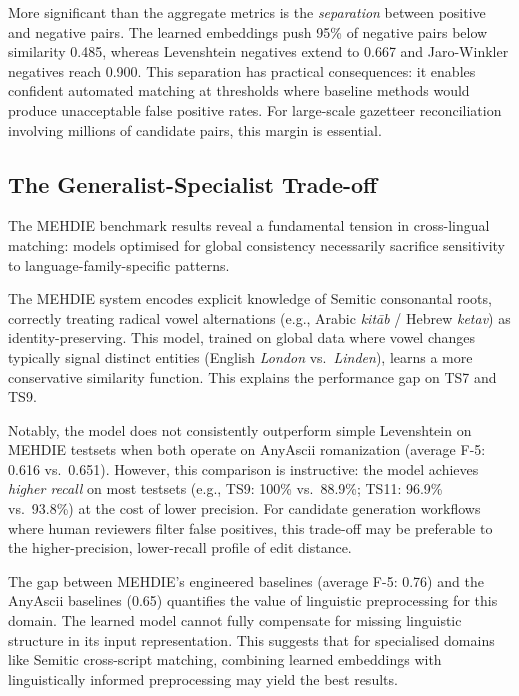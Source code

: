 \documentclass[11pt]{article}
\begin{document}
    More significant than the aggregate metrics is the \emph{separation} between
    positive and negative pairs. The learned embeddings push 95\% of negative pairs
    below similarity 0.485, whereas Levenshtein negatives extend to 0.667 and
    Jaro-Winkler negatives reach 0.900. This separation has practical consequences:
    it enables confident automated matching at thresholds where baseline methods
    would produce unacceptable false positive rates. For large-scale gazetteer
    reconciliation involving millions of candidate pairs, this margin is essential.

    \subsection{The Generalist-Specialist Trade-off}

    The MEHDIE benchmark results reveal a fundamental tension in cross-lingual
    matching: models optimised for global consistency necessarily sacrifice
    sensitivity to language-family-specific patterns.

    The MEHDIE system encodes explicit knowledge of Semitic consonantal roots,
    correctly treating radical vowel alternations (e.g., Arabic \emph{kitāb} /
    Hebrew \emph{ketav}) as identity-preserving. This model, trained on global
    data where vowel changes typically signal distinct entities (English
    \emph{London} vs.\ \emph{Linden}), learns a more conservative similarity
    function. This explains the performance gap on TS7 and TS9.

    Notably, the model does not consistently outperform simple Levenshtein on
    MEHDIE testsets when both operate on AnyAscii romanization (average F-5:
    0.616 vs.\ 0.651). However, this comparison is instructive: the model
    achieves \emph{higher recall} on most testsets (e.g., TS9: 100\% vs.\ 88.9\%;
    TS11: 96.9\% vs.\ 93.8\%) at the cost of lower precision. For candidate
    generation workflows where human reviewers filter false positives, this
    trade-off may be preferable to the higher-precision, lower-recall profile
    of edit distance.

    The gap between MEHDIE's engineered baselines (average F-5: 0.76) and the
    AnyAscii baselines (0.65) quantifies the value of linguistic preprocessing
    for this domain. The learned model cannot fully compensate for missing
    linguistic structure in its input representation. This suggests that for
    specialised domains like Semitic cross-script matching, combining learned
    embeddings with linguistically informed preprocessing may yield the best
    results.
\end{document}
